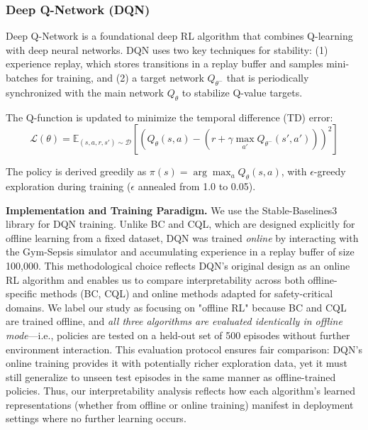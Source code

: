 \subsubsection{Deep Q-Network (DQN)}

Deep Q-Network \citep{mnih2015dqn} is a foundational deep RL algorithm that combines Q-learning with deep neural networks. DQN uses two key techniques for stability: (1) experience replay, which stores transitions in a replay buffer and samples mini-batches for training, and (2) a target network $Q_{\theta^-}$ that is periodically synchronized with the main network $Q_\theta$ to stabilize Q-value targets.

The Q-function is updated to minimize the temporal difference (TD) error:
\begin{equation}
\mathcal{L}(\theta) = \mathbb{E}_{(s,a,r,s') \sim \mathcal{D}} \left[ \left( Q_\theta(s,a) - \left( r + \gamma \max_{a'} Q_{\theta^-}(s', a') \right) \right)^2 \right]
\end{equation}

The policy is derived greedily as $\pi(s) = \arg\max_a Q_\theta(s, a)$, with $\epsilon$-greedy exploration during training ($\epsilon$ annealed from 1.0 to 0.05).

\textbf{Implementation and Training Paradigm.} We use the Stable-Baselines3 library for DQN training. Unlike BC and CQL, which are designed explicitly for offline learning from a fixed dataset, DQN was trained \textit{online} by interacting with the Gym-Sepsis simulator and accumulating experience in a replay buffer of size 100,000. This methodological choice reflects DQN's original design as an online RL algorithm \citep{mnih2015dqn} and enables us to compare interpretability across both offline-specific methods (BC, CQL) and online methods adapted for safety-critical domains. We label our study as focusing on "offline RL" because BC and CQL are trained offline, and \textit{all three algorithms are evaluated identically in offline mode}—i.e., policies are tested on a held-out set of 500 episodes without further environment interaction. This evaluation protocol ensures fair comparison: DQN's online training provides it with potentially richer exploration data, yet it must still generalize to unseen test episodes in the same manner as offline-trained policies. Thus, our interpretability analysis reflects how each algorithm's learned representations (whether from offline or online training) manifest in deployment settings where no further learning occurs.

